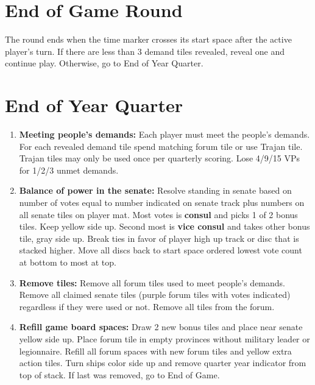 \documentclass[10pt]{article}
\newenvironment{enumerateCustom}
{\begin{enumerate}
  \setlength{\itemsep}{1pt}
  \setlength{\parskip}{0pt}
  \setlength{\parsep}{0pt}}
{\end{enumerate}}
\begin{document}
\begin{multicols*}{2}
\section*{End of Game Round}
The round ends when the time marker crosses its start space after the active player's turn. If there are less than 3 demand tiles revealed, reveal one and continue play. Otherwise, go to End of Year Quarter.

\section*{End of Year Quarter}
\begin{enumerateCustom}
    \item \textbf{Meeting people's demands:} Each player must meet the people's demands. For each revealed demand tile spend matching forum tile or use Trajan tile. Trajan tiles may only be used once per quarterly scoring. Lose 4/9/15 VPs for 1/2/3 unmet demands.
    \item \textbf{Balance of power in the senate:} Resolve standing in senate based on number of votes equal to number indicated on senate track plus numbers on all senate tiles on player mat. Most votes is \textbf{consul} and picks 1 of 2 bonus tiles. Keep yellow side up. Second most is \textbf{vice consul} and takes other bonus tile, gray side up. Break ties in favor of player high up track or disc that is stacked higher. Move all discs back to start space ordered lowest vote count at bottom to most at top.

    \item \textbf{Remove tiles:} Remove all forum tiles used to meet people's demands. Remove all claimed senate tiles (purple forum tiles with votes indicated) regardless if they were used or not. Remove all tiles from the forum.
    \item \textbf{Refill game board spaces:} Draw 2 new bonus tiles and place near senate yellow side up. Place forum tile in empty provinces without military leader or legionnaire. Refill all forum spaces with new forum tiles and yellow extra action tiles. Turn ships color side up and remove quarter year indicator from top of stack. If last was removed, go to End of Game.
\end{enumerateCustom}


\end{multicols*}
\end{document}

